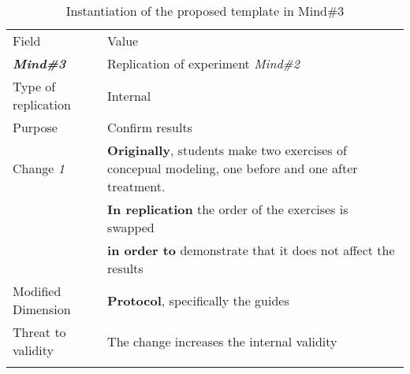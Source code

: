 \begin{table*}[h]
  \caption{Instantiation of the proposed template in Mind\#3}
  
\label{tab:plantEng}
  \centering

\begin{tabularx}{\textwidth}{
  >{\hsize=0.3\hsize}X
  >{\hsize=0.8\hsize}X}
  
    \noalign{\smallskip}\hline\noalign{\smallskip}
  
  Field &  Value  \\ 
  \noalign{\smallskip}\hline\noalign{\smallskip}
  
 \textbf {\textit{Mind\#3}} & Replication of experiment   \textit{Mind\#2}    \\
Type of replication &  Internal   \\ 
Purpose  &   Confirm results   \\  
 \hline
    Change \textit{1}   & \textbf{Originally}, students make two exercises of concepual modeling, one before and one after treatment.  \\& \textbf{In replication} the order of the exercises is swapped \\& \textbf{in order to} demonstrate that it does not affect the results \\
    
    Modified Dimension & 
    \textbf{Protocol}, specifically the guides \\   
    Threat to validity  &  The change increases the internal validity    \\
   \noalign{\smallskip\smallskip}\hline
	\end{tabularx}  
\end{table*}
